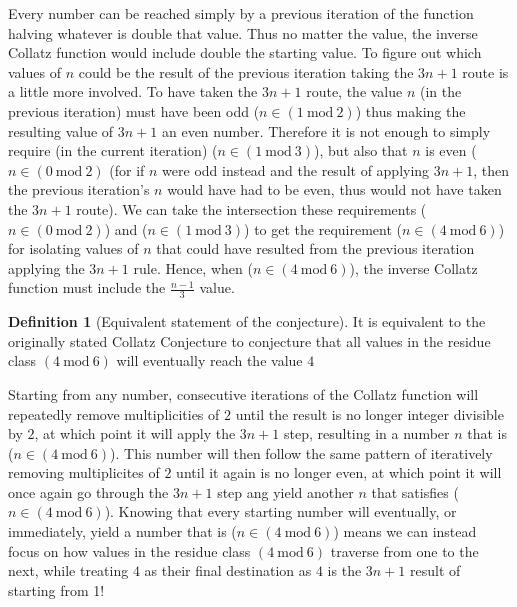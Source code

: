 \documentclass[12pt,a4paper]{amsart}
\numberwithin{equation}{section}
\theoremstyle{plain}
\theoremstyle{definition}
\newtheorem{Def}[Th]{Definition}
\begin{document}
Every number can be reached simply by a previous iteration of the function halving whatever is double that value. Thus no matter the value, the inverse Collatz function would include double the starting value. To figure out which values of $n$ could be the result of the previous iteration taking the $3n+1$ route is a little more involved. To have taken the $3n+1$ route, the value $n$ (in the previous iteration) must have been odd ($n \in \left ( 1\:\mathrm{mod}\:2 \right )$) thus making the resulting value of $3n+1$ an even number. Therefore it is not enough to simply require (in the current iteration) ($n \in \left ( 1\:\mathrm{mod}\:3 \right )$), but also that $n$ is even ($n \in \left ( 0\:\mathrm{mod}\:2 \right )$ (for if $n$ were odd instead and the result of applying $3n+1$, then the previous iteration's $n$ would have had to be even, thus would not have taken the $3n+1$ route). We can take the intersection these requirements ($n \in \left ( 0\:\mathrm{mod}\:2 \right )$) and ($n \in \left ( 1\:\mathrm{mod}\:3 \right )$) to get the requirement ($n \in \left ( 4\:\mathrm{mod}\:6 \right )$) for isolating values of $n$ that could have resulted from the previous iteration applying the $3n+1$ rule. Hence, when ($n \in \left ( 4\:\mathrm{mod}\:6 \right )$), the inverse Collatz function must include the $\frac{n-1}{3}$ value.

\begin{Def}[Equivalent statement of the conjecture]
It is equivalent to the originally stated Collatz Conjecture to conjecture that all values in the residue class $\left ( 4\:\mathrm{mod}\:6 \right )$ will eventually reach the value $4$
\end{Def}

Starting from any number, consecutive iterations of the Collatz function will repeatedly remove multiplicities of $2$ until the result is no longer integer divisible by $2$, at which point it will apply the $3n+1$ step, resulting in a number $n$ that is ($n \in \left ( 4\:\mathrm{mod}\:6 \right )$). This number will then follow the same pattern of iteratively removing multiplicites of $2$ until it again is no longer even, at which point it will once again go through the $3n+1$ step ang yield another $n$ that satisfies ($n \in \left ( 4\:\mathrm{mod}\:6 \right )$). Knowing that every starting number will eventually, or immediately, yield a number that is ($n \in \left ( 4\:\mathrm{mod}\:6 \right )$) means we can instead focus on how values in the residue class $\left ( 4\:\mathrm{mod}\:6 \right )$ traverse from one to the next, while treating $4$ as their final destination as $4$ is the $3n+1$ result of starting from 1!
\end{document}
